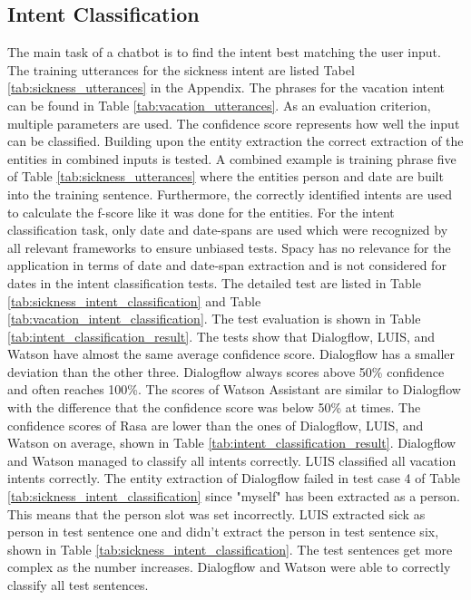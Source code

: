 \subsection*{Intent Classification}
The main task of a chatbot is to find the intent best matching the user input.
The training utterances for the sickness intent are listed Tabel \ref{tab:sickness_utterances}
in the Appendix.
The phrases for the vacation intent can be found in Table \ref{tab:vacation_utterances}.
As an evaluation criterion, multiple parameters are used.
The confidence score represents how well the input can be classified.
Building upon the entity extraction the correct extraction of the entities in combined inputs is tested. 
A combined example is training phrase five of Table \ref{tab:sickness_utterances} 
where the entities person and date are built into the training sentence.
Furthermore, the correctly identified intents are used to calculate the f-score 
like it was done for the entities.
For the intent classification task, only date and date-spans are used which
were recognized by all relevant frameworks to ensure unbiased tests.
Spacy has no relevance for the application in terms of date and date-span
extraction and is not considered for dates in the intent classification tests.
The detailed test are listed in Table \ref{tab:sickness_intent_classification} and 
Table \ref{tab:vacation_intent_classification}.
The test evaluation is shown in Table \ref{tab:intent_classification_result}.
The tests show that Dialogflow, LUIS, and Watson have almost the same average 
confidence score. 
Dialogflow has a smaller deviation than the other three.
Dialogflow always scores above 50\% confidence and often reaches 100\%.
The scores of Watson Assistant are similar to Dialogflow with the difference 
that the confidence score was below 50\% at times.
The confidence scores of Rasa are lower than the ones of Dialogflow, LUIS, and Watson on 
average, shown in 
Table \ref{tab:intent_classification_result}.
Dialogflow and Watson managed to classify all intents correctly.
LUIS classified all vacation intents correctly.
The entity extraction of Dialogflow failed in test case 4 of 
Table \ref{tab:sickness_intent_classification} since "myself" has been extracted as a person.
This means that the person slot was set incorrectly.
LUIS extracted sick as person in test sentence one and didn't extract the person in test sentence six, shown in 
Table \ref{tab:sickness_intent_classification}.
The test sentences get more complex as the number increases.
Dialogflow and Watson were able to correctly classify all test sentences.
